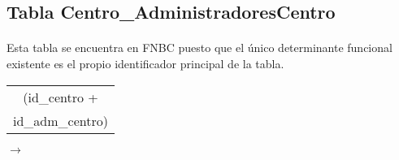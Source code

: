 \subsection{Tabla Centro\_AdministradoresCentro}

  \paragraph{}Esta tabla se encuentra en FNBC puesto que el único
  determinante funcional existente es el propio identificador principal
  de la tabla.

 \begin{center}
    \begin{minipage}{4.2cm}{\begin{flushright}\begin{tabular}{ | c | }
                  \hline
                  (id\_centro + \\
                  id\_adm\_centro) \\
                  \hline
                 \end{tabular}\end{flushright} }
    \end{minipage}
    \begin{minipage}{0.7cm}{$\longrightarrow$}
    \end{minipage}
    \begin{minipage}{5.9cm}{\begin{tabular}{ | c | }
                  \hline
                  \\
                  \hline
                 \end{tabular} }
    \end{minipage}
  \end{center}
